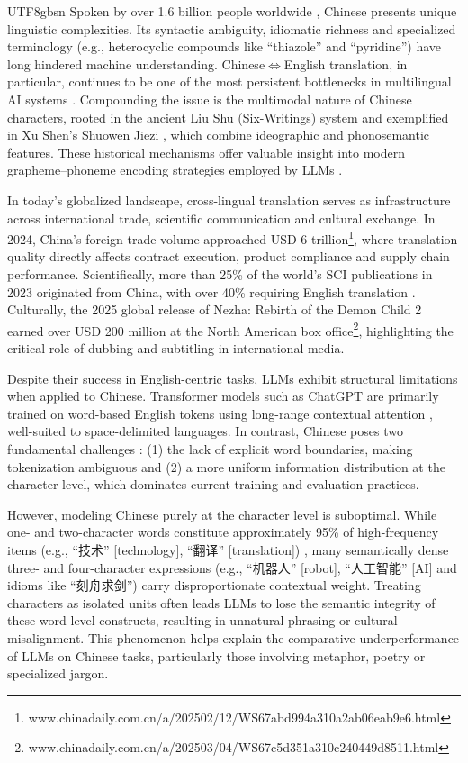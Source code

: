 \documentclass[conference]{IEEEtran}
\begin{document}
\begin{CJK}{UTF8}{gbsn}
Spoken by over 1.6 billion people worldwide \citep{eberhard2023ethnologue}, Chinese presents unique linguistic complexities. Its syntactic ambiguity, idiomatic richness and specialized terminology (e.g., heterocyclic compounds like ``thiazole'' and ``pyridine'') have long hindered machine understanding. Chinese$\Leftrightarrow$English translation, in particular, continues to be one of the most persistent bottlenecks in multilingual AI systems \citep{sun2021chinesebert,cao2020zero}. Compounding the issue is the multimodal nature of Chinese characters, rooted in the ancient Liu Shu (Six-Writings) system and exemplified in Xu Shen’s Shuowen Jiezi \citep{zhou2014six}, which combine ideographic and phonosemantic features. These historical mechanisms offer valuable insight into modern grapheme–phoneme encoding strategies employed by LLMs \citep{weigang2024six}.

In today's globalized landscape, cross-lingual translation serves as infrastructure across international trade, scientific communication and cultural exchange. In 2024, China’s foreign trade volume approached USD 6 trillion\footnote{www.chinadaily.com.cn/a/202502/12/WS67abd994a310a2ab06eab9e6.html}, where translation quality directly affects contract execution, product compliance and supply chain performance. Scientifically, more than 25\% of the world's SCI publications in 2023 originated from China, with over 40\% requiring English translation \citep{jiang2020nsfc}. Culturally, the 2025 global release of Nezha: Rebirth of the Demon Child 2 earned over USD 200 million at the North American box office\footnote{www.chinadaily.com.cn/a/202503/04/WS67c5d351a310c240449d8511.html}, highlighting the critical role of dubbing and subtitling in international media.

Despite their success in English-centric tasks, LLMs exhibit structural limitations when applied to Chinese. Transformer models such as ChatGPT are primarily trained on word-based English tokens using long-range contextual attention \citep{vaswani2017attention}, well-suited to space-delimited languages. In contrast, Chinese poses two fundamental challenges \citep{wong2022introduction,weigang2025threshold}: (1) the lack of explicit word boundaries, making tokenization ambiguous and (2) a more uniform information distribution at the character level, which dominates current training and evaluation practices.

However, modeling Chinese purely at the character level is suboptimal. While one- and two-character words constitute approximately 95\% of high-frequency items (e.g., ``技术'' [technology], ``翻译'' [translation]) \citep{liu1986chinese}, many semantically dense three- and four-character expressions (e.g., ``机器人'' [robot], ``人工智能'' [AI] and idioms like ``刻舟求剑'') carry disproportionate contextual weight. Treating characters as isolated units often leads LLMs to lose the semantic integrity of these word-level constructs, resulting in unnatural phrasing or cultural misalignment. This phenomenon helps explain the comparative underperformance of LLMs on Chinese tasks, particularly those involving metaphor, poetry or specialized jargon.


\end{CJK}
\end{document}
